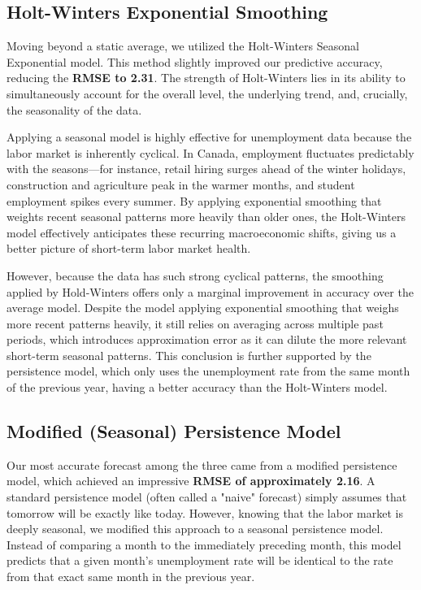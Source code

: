 \documentclass[]{article}
\begin{document}
\subsection{Holt-Winters Exponential Smoothing}
Moving beyond a static average, we utilized the Holt-Winters Seasonal Exponential model. This method slightly improved our predictive accuracy, reducing the \textbf{RMSE to 2.31}. The strength of Holt-Winters lies in its ability to simultaneously account for the overall level, the underlying trend, and, crucially, the seasonality of the data.

Applying a seasonal model is highly effective for unemployment data because the labor market is inherently cyclical. In Canada, employment fluctuates predictably with the seasons—for instance, retail hiring surges ahead of the winter holidays, construction and agriculture peak in the warmer months, and student employment spikes every summer. By applying exponential smoothing that weights recent seasonal patterns more heavily than older ones, the Holt-Winters model effectively anticipates these recurring macroeconomic shifts, giving us a better picture of short-term labor market health.

However, because the data has such strong cyclical patterns, the smoothing applied by Hold-Winters offers only a marginal improvement in accuracy over the average model. Despite the model applying exponential smoothing that weighs more recent patterns heavily, it still relies on averaging across multiple past periods, which introduces approximation error as it can dilute the more relevant short-term seasonal patterns. This conclusion is further supported by the persistence model, which only uses the unemployment rate from the same month of the previous year, having a better accuracy than the Holt-Winters model.

\subsection{Modified (Seasonal) Persistence Model}

Our most accurate forecast among the three came from a modified persistence model, which achieved an impressive \textbf{RMSE of approximately 2.16}. A standard persistence model (often called a "naive" forecast) simply assumes that tomorrow will be exactly like today. However, knowing that the labor market is deeply seasonal, we modified this approach to a seasonal persistence model. Instead of comparing a month to the immediately preceding month, this model predicts that a given month's unemployment rate will be identical to the rate from that exact same month in the previous year.
\end{document}
